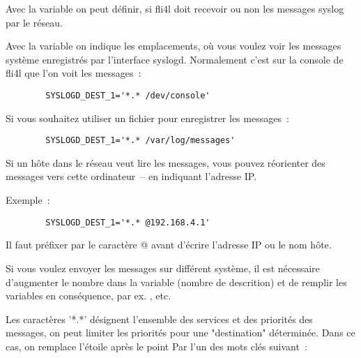   \begin{description}

  Avec la variable  on peut définir, si fli4l doit
  recevoir ou non les messages syslog par le réseau.


  Avec la variable  on indique les emplacements,
  où vous voulez voir les messages système enregistrés par l'interface syslogd.
  Normalement c'est sur la console de fli4l que l'on voit les messages~:

\begin{example}
\begin{verbatim}
        SYSLOGD_DEST_1='*.* /dev/console'
\end{verbatim}
\end{example}

  Si vous souhaitez utiliser un fichier pour enregistrer les messages~:

\begin{example}
\begin{verbatim}
        SYSLOGD_DEST_1='*.* /var/log/messages'
\end{verbatim}
\end{example}

  Si un hôte dans le réseau veut lire les messages, vous pouvez réorienter des
  messages vers cette ordinateur~-- en indiquant l'adresse IP.

  Exemple~:
\begin{example}
\begin{verbatim}
        SYSLOGD_DEST_1='*.* @192.168.4.1'
\end{verbatim}
\end{example}

  Il faut préfixer par le caractère @ avant d'écrire l'adresse IP ou le nom hôte.

  Si vous voulez envoyer les messages sur différent système, il est nécessaire
  d'augmenter le nombre dans la variable  (nombre de
  descrition) et de remplir les variables en conséquence, par ex.
  ,  etc.

  Les caractères '*.*' désignent l'ensemble des services et des
  priorités des messages, on peut limiter les priorités pour une
  "destination" déterminée. Dans ce cas, on remplace l'étoile
  après le point Par l'un des mots clés suivant~:


\end{description}

